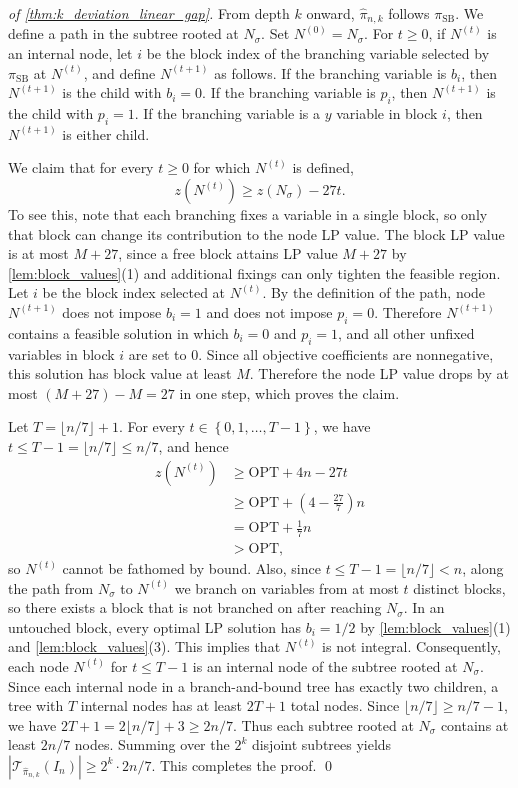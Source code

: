 \documentclass[smallextended,envcountsect]{svjour3} %
\newcommand{\set}[1]{\left\{#1\right\}}
\newcommand{\Tcal}{\mathcal{T}}
\newcommand{\0}{\mathbf{0}}
\newcommand{\1}{\mathbf{1}} %
\begin{document}
\begin{proof}[of \cref{thm:k_deviation_linear_gap}]
		From depth $k$ onward, $\hat\pi_{n,k}$ follows $\pi_{\mathrm{SB}}$.
		We define a path in the subtree rooted at $N_\sigma$.
		Set $N^{(0)}=N_\sigma$.
		For $t\ge 0$, if $N^{(t)}$ is an internal node, let $i$ be the block index of the branching variable selected by $\pi_{\mathrm{SB}}$ at $N^{(t)}$, and define $N^{(t+1)}$ as follows.
		If the branching variable is $b_i$, then $N^{(t+1)}$ is the child with $b_i=0$.
		If the branching variable is $p_i$, then $N^{(t+1)}$ is the child with $p_i=1$.
		If the branching variable is a $y$ variable in block $i$, then $N^{(t+1)}$ is either child.

		We claim that for every $t\ge 0$ for which $N^{(t)}$ is defined,
		\[
			z(N^{(t)})\ge z(N_\sigma)-27t.
		\]
		To see this, note that each branching fixes a variable in a single block, so only that block can change its contribution to the node LP value.
		The block LP value is at most $M+27$, since a free block attains LP value $M+27$ by \cref{lem:block_values}(1) and additional fixings can only tighten the feasible region.
		Let $i$ be the block index selected at $N^{(t)}$.
		By the definition of the path, node $N^{(t+1)}$ does not impose $b_i=1$ and does not impose $p_i=0$.
		Therefore $N^{(t+1)}$ contains a feasible solution in which $b_i=0$ and $p_i=1$, and all other unfixed variables in block $i$ are set to $0$.
	Since all objective coefficients are nonnegative, this solution has block value at least $M$.
	Therefore the node LP value drops by at most $(M+27)-M=27$ in one step, which proves the claim.

				Let $T=\lfloor n/7\rfloor+1$.
				For every $t\in\set{0,1,\dots,T-1}$, we have $t\le T-1=\lfloor n/7\rfloor\le n/7$, and hence
				\begin{align*}
					z(N^{(t)})
					 &\ge \mathrm{OPT}+4n-27t \\
					 &\ge \mathrm{OPT}+\left(4-\tfrac{27}{7}\right)n \\
					 &= \mathrm{OPT}+\tfrac{1}{7}n \\
					 &> \mathrm{OPT},
				\end{align*}
				so $N^{(t)}$ cannot be fathomed by bound.
	Also, since $t\le T-1=\lfloor n/7\rfloor<n$, along the path from $N_\sigma$ to $N^{(t)}$ we branch on variables from at most $t$ distinct blocks, so there exists a block that is not branched on after reaching $N_\sigma$.
	In an untouched block, every optimal LP solution has $b_i=1/2$ by \cref{lem:block_values}(1) and \cref{lem:block_values}(3).
	This implies that $N^{(t)}$ is not integral.
	Consequently, each node $N^{(t)}$ for $t\le T-1$ is an internal node of the subtree rooted at $N_\sigma$.
	Since each internal node in a branch-and-bound tree has exactly two children, a tree with $T$ internal nodes has at least $2T+1$ total nodes.
	Since $\lfloor n/7\rfloor\ge n/7-1$, we have $2T+1=2\lfloor n/7\rfloor+3\ge 2n/7$.
	Thus each subtree rooted at $N_\sigma$ contains at least $2n/7$ nodes.
	Summing over the $2^k$ disjoint subtrees yields $|\Tcal_{\hat\pi_{n,k}}(I_n)|\ge 2^k\cdot 2n/7$.
	This completes the proof.
\qed
\end{proof}
\end{document}
